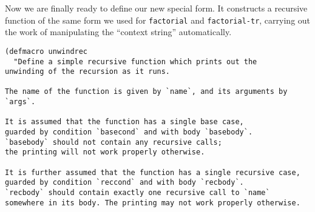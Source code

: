 \documentclass[11pt]{article}
\begin{document}
Now we are finally ready to define our new special form.
It constructs a recursive function of the same form
we used for \texttt{factorial} and \texttt{factorial-tr},
carrying out the work of manipulating the “context string”
automatically.
\begin{verbatim}
(defmacro unwindrec
  "Define a simple recursive function which prints out the
unwinding of the recursion as it runs.

The name of the function is given by `name`, and its arguments by `args`.

It is assumed that the function has a single base case,
guarded by condition `basecond` and with body `basebody`.
`basebody` should not contain any recursive calls;
the printing will not work properly otherwise.

It is further assumed that the function has a single recursive case,
guarded by condition `reccond` and with body `recbody`.
`recbody` should contain exactly one recursive call to `name`
somewhere in its body. The printing may not work properly otherwise.


\end{verbatim}
\end{document}
